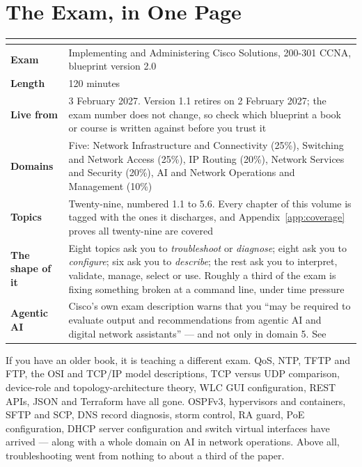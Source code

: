\newpage

\chapter*{The Exam, in One Page}

\begin{longtable}{@{}L{4.0cm}L{11.4cm}@{}}
\toprule
{}
\textbf{} & \textbf{} \\
\midrule
\endhead
\textbf{Exam} & Implementing and Administering Cisco Solutions, 200-301 CCNA,
blueprint version 2.0 \\
\textbf{Length} & 120 minutes \\
\textbf{Live from} & 3 February 2027. Version 1.1 retires on 2 February 2027;
the exam number does not change, so check which blueprint a book or course is
written against before you trust it \\
\textbf{Domains} & Five: Network Infrastructure and Connectivity (25\%),
Switching and Network Access (25\%), IP Routing (20\%), Network Services and
Security (20\%), AI and Network Operations and Management (10\%) \\
\textbf{Topics} & Twenty-nine, numbered 1.1 to 5.6. Every chapter of this volume
is tagged with the ones it discharges, and Appendix~\ref{app:coverage} proves all
twenty-nine are covered \\
\textbf{The shape of it} & Eight topics ask you to \emph{troubleshoot} or
\emph{diagnose}; eight ask you to \emph{configure}; six ask you to
\emph{describe}; the rest ask you to interpret, validate, manage, select or use.
Roughly a third of the exam is fixing something broken at a command line, under
time pressure \\
\textbf{Agentic AI} & Cisco's own exam description warns that you ``may be
required to evaluate output and recommendations from agentic AI and digital
network assistants'' --- and not only in domain 5. See  \\
\bottomrule
\end{longtable}

\begin{alertbox}
If you have an older book, it is teaching a different exam. QoS, NTP, TFTP and
FTP, the OSI and TCP/IP model descriptions, TCP versus UDP comparison,
device-role and topology-architecture theory, WLC GUI configuration, REST APIs,
JSON and Terraform have all gone. OSPFv3, hypervisors and containers, SFTP and
SCP, DNS record diagnosis, storm control, RA guard, PoE configuration, DHCP
server configuration and switch virtual interfaces have arrived --- along with a
whole domain on AI in network operations. Above all, troubleshooting went from
nothing to about a third of the paper.
\end{alertbox}

